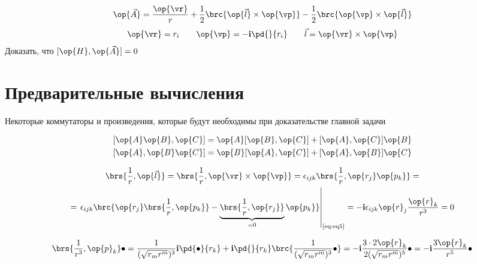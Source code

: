 \begin{equation}
\label{eq:2}
\op{\vec{A}} = \frac{\op{\vr}}{r} + \frac{1}{2} \brc{\op{\vec{l}} \times \op{\vp}} - \frac{1}{2} \brc{ \op{\vp} \times \op{\vec{l}}}
\end{equation}
$$
\begin{array}{lll}
\op{\vr} = r_i  ~~~& \displaystyle \op{\vp} = -\mathbf{i} \pd{}{r_i}  ~~~&  \vec{l} = \op{\vr} \times \op{\vp}
\end{array}
$$
Доказать, что $[\op{H},\op{\vec{A}}] = 0$


\section*{Предварительные вычисления}

Некоторые коммутаторы и произведения, которые будут необходимы при доказательстве главной задачи

\begin{equation}
\label{eq:eq1}
\begin{gathered}
{[\op{A} \op{B}, \op{C}]} = \op{A} [\op{B},\op{C}] + [\op{A},\op{C}]\op{B} \\
{[\op{A}, \op{B} \op{C}]} = \op{B}[\op{A},\op{C}] + [\op{A},\op{B}]\op{C}
\end{gathered}
\end{equation}

\begin{equation}
\label{eq:eq2}
\begin{gathered}
\brs{\frac{1}{r}, \op{\vec{l}}} = \brs{\frac{1}{r}, \op{\vr} \times \op{\vp}} = \epsilon_{ijk} \brs{ \frac{1}{r}, \op{r_j}\op{p_k} } = \\ =
\left. \epsilon_{ijk} \brc{ \op{r_j} \brs{ \frac{1}{r}, \op{p_k} } - \underbrace{ \brs{ \frac{1}{r}, \op{r_j} } }_{=0} \op{p_k} } \right|_{\text{\eqref{eq:eq5}}} = 
-\mathbf{i} \epsilon_{ijk} \op{r}_j \frac{\op{r}_k}{r^3} = 0
\end{gathered}
\end{equation}

\begin{equation}
\label{eq:eq3}
\begin{gathered}
\brs{\frac{1}{r^3},\op{p}_k} \bullet = \frac{1}{(\sqrt{r_m r^m})^3} \mathbf{i} \pd{\bullet}{r_k}  + \mathbf{i} \pd{}{r_k} \brc{\frac{1}{(\sqrt{r_m r^m})^3} \bullet} = -\mathbf{i} \frac{3 \cdot 2 \op{r}_k}{2 (\sqrt{r_m r^m})^5} \bullet = -\mathbf{i} \frac{3 \op{r}_k}{r^5} \bullet
\end{gathered}
\end{equation}

